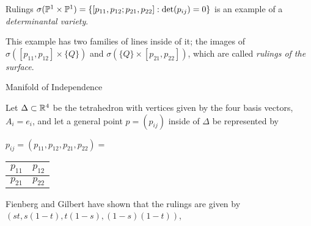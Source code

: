 \begin{frame}
    
    \begin{block}{Rulings}
    $\sigma(\mathbb{P}^{1} \times \mathbb{P}^{1}) = \{ [p_{11}, p_{12}; p_{21}, p_{22}] : \det (p_{ij}) = 0 \} $ is an example of a \emph{determinantal variety}.
    
    This example has two families of lines inside of it; the images of $\sigma( [p_{11}, p_{12}] \times \{ Q \} )$ and $\sigma( \{ Q \} \times [p_{21}, p_{22}])$, which are called \emph{rulings of the surface}.
    \end{block}

\end{frame}

\begin{frame}{Manifold of Independence}
    
    Let $\Delta \subset \mathbb{R}^{4}$ be the tetrahedron with vertices given by the four basis vectors, $A_{i} = e_{i}$, and let a general point $p = (p_{ij})$ inside of $\Delta$ be represented by

\begin{center}
    \begin{table}[]
    $p_{ij} = (p_{11}, p_{12}, p_{21}, p_{22}) =$ 
    \begin{tabular}{|l|l|}
    \hline
    $p_{11}$ & $p_{12}$ \\ \hline
    $p_{21}$ & $p_{22}$ \\ \hline
    \end{tabular}
    \end{table}
\end{center}

Fienberg and Gilbert have shown that the rulings are given by $(st, s(1-t), t(1-s), (1-s)(1-t))$,

\end{frame}